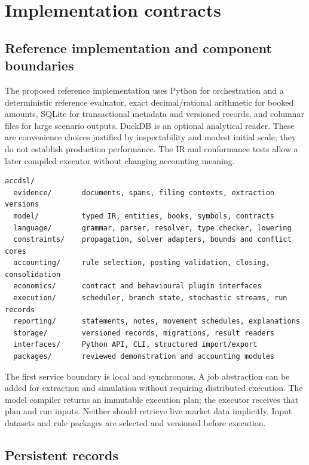 \chapter{Implementation contracts}
\label{ch:implementation}

\section{Reference implementation and component boundaries}

The proposed reference implementation uses Python for orchestration and a deterministic
reference evaluator, exact decimal/rational arithmetic for booked amounts,
SQLite for transactional metadata and versioned records, and columnar files
for large scenario outputs. DuckDB is an optional analytical reader. These
are convenience choices justified by inspectability and modest initial scale;
they do not establish production performance. The IR and conformance tests
allow a later compiled executor without changing accounting meaning.

\begin{lstlisting}
accdsl/
  evidence/       documents, spans, filing contexts, extraction versions
  model/          typed IR, entities, books, symbols, contracts
  language/       grammar, parser, resolver, type checker, lowering
  constraints/    propagation, solver adapters, bounds and conflict cores
  accounting/     rule selection, posting validation, closing, consolidation
  economics/      contract and behavioural plugin interfaces
  execution/      scheduler, branch state, stochastic streams, run records
  reporting/      statements, notes, movement schedules, explanations
  storage/        versioned records, migrations, result readers
  interfaces/     Python API, CLI, structured import/export
  packages/       reviewed demonstration and accounting modules
\end{lstlisting}

The first service boundary is local and synchronous. A job abstraction can be
added for extraction and simulation without requiring distributed execution.
The model compiler returns an immutable execution plan; the executor receives
that plan and run inputs. Neither should retrieve live market data implicitly.
Input datasets and rule packages are selected and versioned before execution.

\section{Persistent records}

